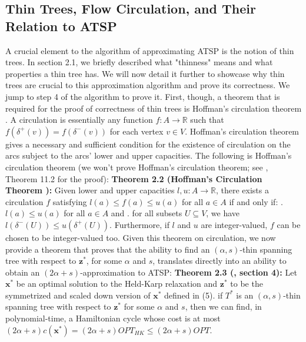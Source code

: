 \documentclass[oneside]{projectpaper} %
\begin{document}
\subsection{Thin Trees, Flow Circulation, and Their Relation to ATSP}
A crucial element to the algorithm of approximating ATSP is the notion of thin trees. In section 2.1, we briefly described what "thinness" means and what properties a thin tree has. We will now detail it further to showcase why thin trees are crucial to this approximation algorithm and prove its correctness. \newline
\indent We jump to step 4 of the algorithm to prove it. First, though, a theorem that is required for the proof of correctness of thin trees is Hoffman's circulation theorem \cite{Sch03}. A circulation is essentially any function $f : A \rightarrow \mathbb{R}$ such that $f(\delta^+(v)) = f(\delta^-(v))$ for each vertex $v \in V$. Hoffman's circulation theorem gives a necessary and sufficient condition for the existence of circulation on the arcs subject to the arcs' lower and upper capacities. The following is Hoffman's circulation theorem (we won't prove Hoffman's circulation theorem; see \cite{Sch03}, Theorem 11.2 for the proof):
\newline
\newline
\textbf{Theorem 2.2 (Hoffman's Circulation Theorem \cite{Sch03}):} Given lower and upper capacities $l, u : A \rightarrow \mathbb{R}$, there exists a circulation $f$ satisfying $l(a) \leq f(a) \leq u(a)$ for all $a \in A$ if and only if:
\newline {}. $l(a) \leq u(a)$ for all $a \in A$ and
\newline {}. for all subsets $U \subseteq V$, we have $l(\delta^-(U)) \leq u(\delta^+(U))$.
\newline Furthermore, if $l$ and $u$ are integer-valued, $f$ can be chosen to be integer-valued too.
\newline
\newline
Given this theorem on circulation, we now provide a theorem that proves that the ability to find an $(\alpha, s)$-thin spanning tree with respect to $\textbf{z}^*$, for some $\alpha$ and $s$, translates directly into an ability to obtain an $(2\alpha + s)$-approximation to ATSP:
\newline
\newline
\textbf{Theorem 2.3 (\cite{AGM10}, section 4):} Let $\textbf{x}^*$ be an optimal solution to the Held-Karp relaxation and $\textbf{z}^*$ to be the symmetrized and scaled down version of $\textbf{x}^*$ defined in (5). if $T^*$ is an $(\alpha, s)$-thin spanning tree with respect to $\textbf{z}^*$ for some $\alpha$ and $s$, then we can find, in polynomial-time, a Hamiltonian cycle whose cost is at most $(2\alpha + s)c(\textbf{x}^*) = (2\alpha + s)OPT_{HK} \leq (2\alpha + s)OPT$.
\end{document}
